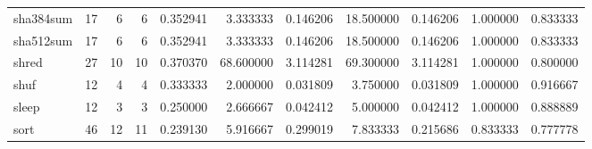 \begin{tabular}{lrrrrrrrrrr}
sha384sum &                                      17 &                  6 &                                 6 &                                   0.352941 &                               3.333333 &                                     0.146206 &                         18.500000 &                                0.146206 &                           1.000000 &                                           0.833333 \\
sha512sum &                                      17 &                  6 &                                 6 &                                   0.352941 &                               3.333333 &                                     0.146206 &                         18.500000 &                                0.146206 &                           1.000000 &                                           0.833333 \\
shred     &                                      27 &                 10 &                                10 &                                   0.370370 &                              68.600000 &                                     3.114281 &                         69.300000 &                                3.114281 &                           1.000000 &                                           0.800000 \\
shuf      &                                      12 &                  4 &                                 4 &                                   0.333333 &                               2.000000 &                                     0.031809 &                          3.750000 &                                0.031809 &                           1.000000 &                                           0.916667 \\
sleep     &                                      12 &                  3 &                                 3 &                                   0.250000 &                               2.666667 &                                     0.042412 &                          5.000000 &                                0.042412 &                           1.000000 &                                           0.888889 \\
sort      &                                      46 &                 12 &                                11 &                                   0.239130 &                               5.916667 &                                     0.299019 &                          7.833333 &                                0.215686 &                           0.833333 &                                           0.777778 \\

\end{tabular}
